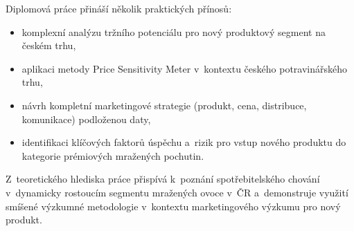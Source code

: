 Diplomová práce přináší několik praktických přínosů:
\begin{itemize}
  \item komplexní analýzu tržního potenciálu pro nový produktový segment na českém trhu,
  \item aplikaci metody Price Sensitivity Meter v~kontextu českého potravinářského trhu,
  \item návrh kompletní marketingové strategie (produkt, cena, distribuce, komunikace) podloženou daty,
  \item identifikaci klíčových faktorů úspěchu a~rizik pro vstup nového produktu do kategorie prémiových mražených pochutin.
\end{itemize}

Z~teoretického hlediska práce přispívá k~poznání spotřebitelského chování v~dynamicky rostoucím segmentu mražených ovoce v~ČR a~demonstruje využití smíšené výzkumné metodologie v~kontextu marketingového výzkumu pro nový produkt.
